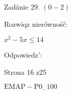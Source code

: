 \documentclass[a4paper,12pt]{article}
\begin{document}
Zadänie 29. $(0-2)$

Rozwiqz nierównośč:

$x^{2}-5x\leq 14$

Odpowiedz':

Strona 16 z25

$\mathrm{E}\mathrm{M}\mathrm{A}\mathrm{P}-\mathrm{P}0_{-}100$
\end{document}
